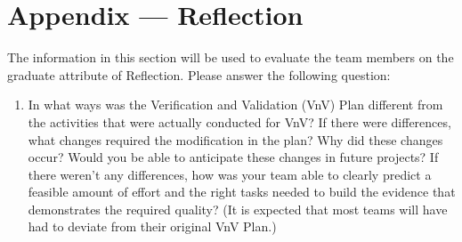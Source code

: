 \documentclass[12pt, titlepage]{article}
\begin{document}
\newpage{}
\section*{Appendix --- Reflection}

The information in this section will be used to evaluate the team members on the
graduate attribute of Reflection.  Please answer the following question:

\begin{enumerate}
  \item In what ways was the Verification and Validation (VnV) Plan different
  from the activities that were actually conducted for VnV?  If there were
  differences, what changes required the modification in the plan?  Why did
  these changes occur?  Would you be able to anticipate these changes in future
  projects?  If there weren't any differences, how was your team able to clearly
  predict a feasible amount of effort and the right tasks needed to build the
  evidence that demonstrates the required quality?  (It is expected that most
  teams will have had to deviate from their original VnV Plan.)
\end{enumerate}
\end{document}
